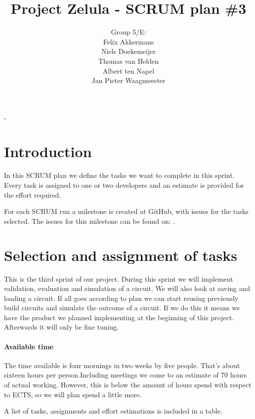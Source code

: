 \documentclass[a4paper]{article}
\title{Project Zelula - SCRUM plan \#3}
\author{Group 5/E:\\
Felix Akkermans \\
Niels Doekemeijer \\
Thomas van Helden \\
Albert ten Napel \\
Jan Pieter Waagmeester}
\begin{document}
-\maketitle

\section{Introduction}
In this SCRUM plan we define the tasks we want to complete in this sprint. Every task is assigned to one or two developers and an estimate is provided for the effort required.

For each SCRUM run a milestone is created at GitHub, with issues for the tasks selected. The issues for this milestone can be found on: .

\section{Selection and assignment of tasks}
This is the third sprint of our project. During this sprint we will implement validation, evaluation and simulation of a circuit. We will also look at saving and loading a circuit. If all goes according to plan we can start reusing previously build circuits and simulate the outcome of a circuit. If we do this it means we have the product we planned implementing at the beginning of this project. Afterwards it will only be fine tuning.

\paragraph{Available time}
The time available is four mornings in two weeks by five people. That's about sixteen hours per person.Including meetings we come to an estimate of 70 hours of actual working. However, this is below the amount of hours spend with respect to ECTS, so we will plan spend a little more.

A list of tasks, assignments and effort estimations is included in a table.
\end{document}
